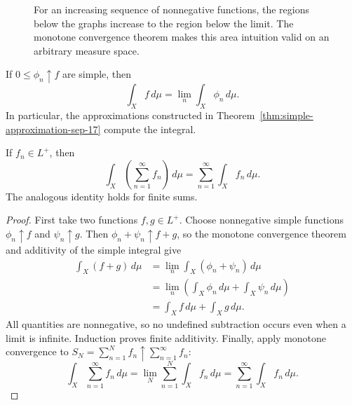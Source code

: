 \begin{figure}[htbp]
  \centering
  \caption{For an increasing sequence of nonnegative functions, the
    regions below the graphs increase to the region below the limit.
    The monotone convergence theorem makes this area intuition valid
    on an arbitrary measure space.}
  \label{fig:mct-sep-22}
\end{figure}

\begin{corollary}
  If $0\leq\phi_n\uparrow f$ are simple, then
  \[
    \int_X f\,d\mu=\lim_n\int_X\phi_n\,d\mu.
  \]
  In particular, the approximations constructed in
  Theorem~\ref*{thm:simple-approximation-sep-17} compute the integral.
\end{corollary}

\begin{proposition}
  \label{prop:nonnegative-series-sep-22}
  If $f_n\in L^+$, then
  \[
    \int_X\left(\sum_{n=1}^{\infty}f_n\right)\,d\mu
      =\sum_{n=1}^{\infty}\int_X f_n\,d\mu.
  \]
  The analogous identity holds for finite sums.
\end{proposition}

\begin{proof}
  First take two functions $f,g\in L^+$. Choose nonnegative simple
  functions $\phi_n\uparrow f$ and $\psi_n\uparrow g$. Then
  $\phi_n+\psi_n\uparrow f+g$, so the monotone convergence theorem and
  additivity of the simple integral give
  \begin{align*}
    \int_X(f+g)\,d\mu
      &=\lim_n\int_X(\phi_n+\psi_n)\,d\mu\\
      &=\lim_n\left(\int_X\phi_n\,d\mu+\int_X\psi_n\,d\mu\right)\\
      &=\int_X f\,d\mu+\int_X g\,d\mu.
  \end{align*}
  All quantities are nonnegative, so no undefined subtraction occurs
  even when a limit is infinite. Induction proves finite additivity.
  Finally, apply monotone convergence to
  $S_N=\sum_{n=1}^N f_n\uparrow\sum_{n=1}^{\infty}f_n$:
  \[
    \int_X\sum_{n=1}^{\infty}f_n\,d\mu
      =\lim_N\sum_{n=1}^N\int_X f_n\,d\mu
      =\sum_{n=1}^{\infty}\int_X f_n\,d\mu.
  \]
\end{proof}

